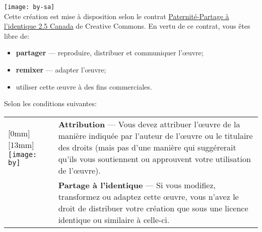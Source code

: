 \texttt{[image: by-sa]}\\%
Cette création est mise à disposition selon le contrat
\href{http://creativecommons.org/licenses/by-sa/2.5/ca/}{%
  Paternité-Partage à l'identique 2.5 Canada} de Creative Commons. En
vertu de ce contrat, vous êtes libre de:
\begin{itemize}
\item \textbf{partager} --- reproduire, distribuer et communiquer
  l'{\oe}uvre;
\item \textbf{remixer} --- adapter l'{\oe}uvre;
\item utiliser cette {\oe}uvre à des fins commerciales.
\end{itemize}
Selon les conditions suivantes:

\begin{tabularx}{\linewidth}{@{}lX@{}}
  \raisebox{-9mm}[0mm][13mm]{%
    \texttt{[image: by]}} &
  \textbf{Attribution} --- Vous devez attribuer l'{\oe}uvre de la
  manière indiquée par l'auteur de l'{\oe}uvre ou le titulaire des
  droits (mais pas d'une manière qui suggérerait qu'ils vous
  soutiennent ou
  approuvent votre utilisation de l'{\oe}uvre). \\
  \raisebox{-9mm}{\texttt{[image: sa]}}
  & \textbf{Partage à l'identique} --- Si vous modifiez, transformez
  ou adaptez cette {\oe}uvre, vous n'avez le droit de distribuer votre
  création que sous une licence identique ou similaire à celle-ci.
\end{tabularx}
